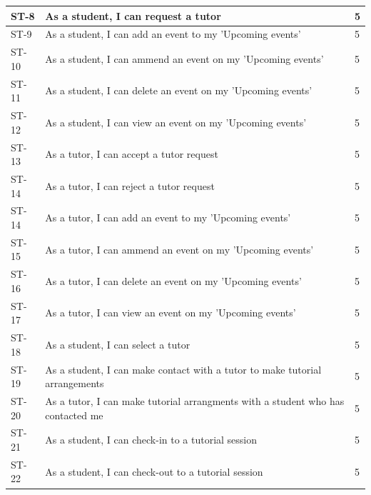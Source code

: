 \documentclass[12pt]{article}
\begin{document}
{{\begin{longtable}{| l | p{10cm}| l |}
			\\ \hline ST-8 & As a student, I can  request a tutor  & 5 													
			\\ \hline ST-9 & As a student, I can  add an event to my 'Upcoming events'  & 5 
			
			\\ \hline ST-10 & As a student, I can  ammend an event on my 'Upcoming events'  & 5 
			
			\\ \hline ST-11 & As a student, I can  delete an event on my 'Upcoming events'  & 5 	
			
			\\ \hline ST-12 & As a student, I can  view an event on my 'Upcoming events'  & 5 
			
			\\ \hline ST-13 & As a tutor, I can  accept a tutor request  & 5 			
						
						\\ \hline ST-14 & As a tutor, I can  reject a tutor request  & 5 									
			
			\\ \hline ST-14 & As a tutor, I can  add an event to my 'Upcoming events'  & 5 
			
			\\ \hline ST-15 & As a tutor, I can  ammend an event on my 'Upcoming events'  & 5 
			
			\\ \hline ST-16 & As a tutor, I can  delete an event on my 'Upcoming events'  & 5 
			
			\\ \hline ST-17 & As a tutor, I can  view an event on my 'Upcoming events'  & 5 

			\\ \hline ST-18 & As a student, I can  select a tutor  & 5 
			
			\\ \hline ST-19 & As a student, I can  make contact with a tutor to make tutorial arrangements  & 5 
			
			\\ \hline ST-20 & As a tutor, I can  make tutorial arrangments with a student who has contacted me  & 5

			\\ \hline ST-21 & As a student, I can  check-in to a tutorial session  & 5 
			
			\\ \hline ST-22 & As a student, I can  check-out to a tutorial session  & 5 
			

\end{longtable}}}
\end{document}
